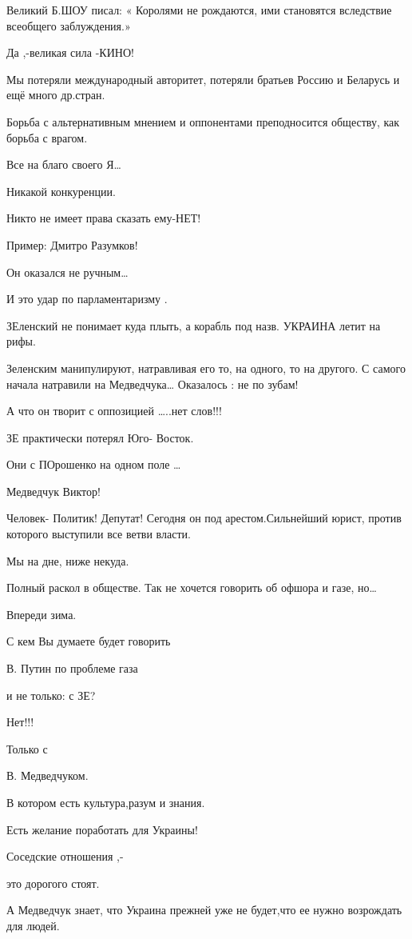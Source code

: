 Великий  Б.ШОУ писал: « Королями не рождаются, ими становятся вследствие
всеобщего заблуждения.»

Да ,-великая сила -КИНО!

Мы потеряли международный авторитет, потеряли братьев Россию и Беларусь и ещё
много др.стран.

Борьба с альтернативным мнением и оппонентами преподносится обществу, как
борьба с врагом.  

Все на благо своего Я…

Никакой конкуренции. 

Никто не имеет  права сказать ему-НЕТ!

Пример: Дмитро Разумков!

Он оказался не ручным…

И это удар по парламентаризму .

ЗЕленский не понимает куда  плыть, а корабль под назв. УКРАИНА летит на рифы.

 Зеленским манипулируют, натравливая его то, на одного, то на другого. С самого
 начала натравили на Медведчука… Оказалось  : не по зубам!

А что он творит с оппозицией …..нет слов!!!

ЗЕ практически потерял Юго- Восток. 

Они с ПОрошенко  на одном поле …

Медведчук Виктор! 

Человек-  Политик! Депутат! Сегодня он под арестом.Сильнейший юрист, против
которого выступили все ветви власти.

 Мы на дне, ниже некуда. 

Полный раскол в обществе.  Так не хочется говорить об офшора и газе, но…

Впереди зима. 

С кем Вы думаете будет говорить 

В. Путин по проблеме газа 

и не только: с ЗЕ? 

Нет!!! 

Только с 

В. Медведчуком. 

В котором есть  культура,разум и знания.  

Есть желание поработать для Украины!

Соседские отношения ,-

это дорогого стоят. 

А Медведчук знает, что Украина прежней уже не будет,что ее нужно возрождать для
людей.

